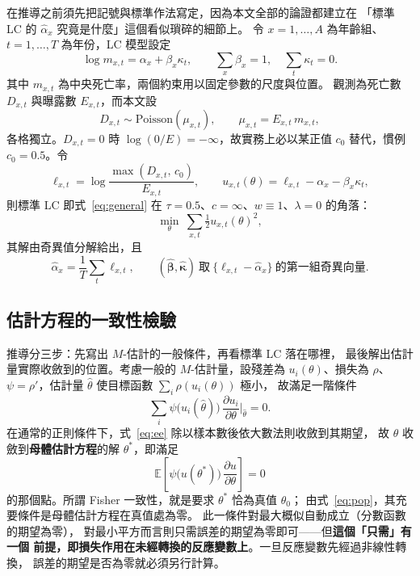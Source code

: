 \documentclass[UTF8, fontset=macnew, a4paper, 12pt]{ctexart}
\newcommand{\Ex}{\mathbb{E}}
\begin{document}
在推導之前須先把記號與標準作法寫定，因為本文全部的論證都建立在
「標準 LC 的 $\hat\alpha_x$ 究竟是什麼」這個看似瑣碎的細節上。
令 $x=1,\dots,A$ 為年齡組、$t=1,\dots,T$ 為年份，LC 模型設定
\begin{equation}\label{eq:lc}
\log m_{x,t}=\alpha_x+\beta_x\kappa_t,\qquad
\sum_x\beta_x=1,\quad \sum_t\kappa_t=0 .
\end{equation}
其中 $m_{x,t}$ 為中央死亡率，兩個約束用以固定參數的尺度與位置。
觀測為死亡數 $D_{x,t}$ 與曝露數 $E_{x,t}$，而本文設
\begin{equation}\label{eq:pois}
D_{x,t}\sim\text{Poisson}(\mu_{x,t}),\qquad \mu_{x,t}=E_{x,t}\,m_{x,t},
\end{equation}
各格獨立。$D_{x,t}=0$ 時 $\log(0/E)=-\infty$，故實務上必以某正值 $c_0$
替代，慣例 $c_0=0.5$。令
\begin{equation}\label{eq:ell}
\ell_{x,t}=\log\frac{\max(D_{x,t},\,c_0)}{E_{x,t}},\qquad
u_{x,t}(\theta)=\ell_{x,t}-\alpha_x-\beta_x\kappa_t,
\end{equation}
則標準 LC 即式~\eqref{eq:general} 在
$\tau=0.5$、$c=\infty$、$w\equiv1$、$\lambda=0$ 的角落：
\begin{equation}\label{eq:lcobj}
\min_{\theta}\ \sum_{x,t}\tfrac12 u_{x,t}(\theta)^2 ,
\end{equation}
其解由奇異值分解給出，且
\begin{equation}\label{eq:svd}
\hat\alpha_x=\frac1T\sum_t \ell_{x,t},\qquad
(\hat{\boldsymbol\beta},\hat{\boldsymbol\kappa})\ \text{取}\
\{\ell_{x,t}-\hat\alpha_x\}\ \text{的第一組奇異向量} .
\end{equation}

\subsection{估計方程的一致性檢驗}

推導分三步：先寫出 $M$-估計的一般條件，再看標準 LC 落在哪裡，
最後解出估計量實際收斂到的位置。考慮一般的 $M$-估計量，設殘差為 $u_i(\theta)$、損失為 $\rho$、
$\psi=\rho'$，估計量 $\hat\theta$ 使目標函數 $\sum_i\rho(u_i(\theta))$ 極小，
故滿足一階條件
\begin{equation}\label{eq:ee}
\sum_i \psi\big(u_i(\hat\theta)\big)\,
\frac{\partial u_i}{\partial\theta}\Big|_{\hat\theta}=0 .
\end{equation}
在通常的正則條件下，式~\eqref{eq:ee} 除以樣本數後依大數法則收斂到其期望，
故 $\hat\theta$ 收斂到\textbf{母體估計方程}的解 $\theta^{\ast}$，即滿足
\begin{equation}\label{eq:pop}
\Ex\!\left[\psi\big(u(\theta^{\ast})\big)\,
\frac{\partial u}{\partial\theta}\right]=0
\end{equation}
的那個點。所謂 Fisher 一致性，就是要求 $\theta^{\ast}$ 恰為真值 $\theta_0$；
由式~\eqref{eq:pop}，其充要條件是母體估計方程在真值處為零。
此一條件對最大概似自動成立（分數函數的期望為零），
對最小平方而言則只需誤差的期望為零即可——但\textbf{這個「只需」有一個
前提，即損失作用在未經轉換的反應變數上}。一旦反應變數先經過非線性轉換，
誤差的期望是否為零就必須另行計算。
\end{document}
